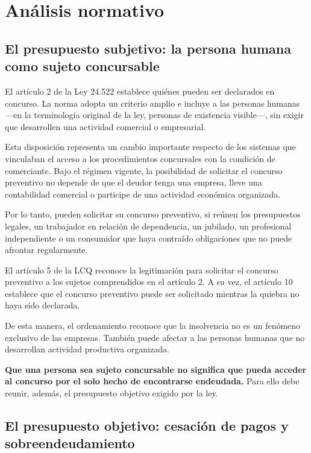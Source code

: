 \documentclass[12pt,oneside]{book}
\begin{document}
\chapter[Análisis normativo]{Análisis normativo}

\section{El presupuesto subjetivo: la persona humana como sujeto concursable}

El artículo 2 de la Ley 24.522 establece quiénes pueden ser declarados en concurso. La norma adopta un criterio amplio e incluye a las personas humanas ---en la terminología original de la ley, personas de existencia visible---, sin exigir que desarrollen una actividad comercial o empresarial.

Esta disposición representa un cambio importante respecto de los sistemas que vinculaban el acceso a los procedimientos concursales con la condición de comerciante. Bajo el régimen vigente, la posibilidad de solicitar el concurso preventivo no depende de que el deudor tenga una empresa, lleve una contabilidad comercial o participe de una actividad económica organizada.

Por lo tanto, pueden solicitar su concurso preventivo, si reúnen los presupuestos legales, un trabajador en relación de dependencia, un jubilado, un profesional independiente o un consumidor que haya contraído obligaciones que no puede afrontar regularmente.

El artículo 5 de la LCQ reconoce la legitimación para solicitar el concurso preventivo a los sujetos comprendidos en el artículo 2. A su vez, el artículo 10 establece que el concurso preventivo puede ser solicitado mientras la quiebra no haya sido declarada.

De esta manera, el ordenamiento reconoce que la insolvencia no es un fenómeno exclusivo de las empresas. También puede afectar a las personas humanas que no desarrollan actividad productiva organizada.

\begin{important}
\textbf{Que una persona sea sujeto concursable no significa que pueda acceder al concurso por el solo hecho de encontrarse endeudada.} Para ello debe reunir, además, el presupuesto objetivo exigido por la ley.
\end{important}

\section{El presupuesto objetivo: cesación de pagos y sobreendeudamiento}
\end{document}
